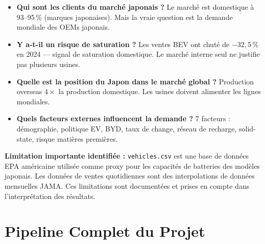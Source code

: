 \documentclass[12pt,a4paper]{article}
\begin{document}
\begin{itemize}
  \item \textbf{Qui sont les clients du marché japonais ?} Le marché est domestique à 93--95\,\%
        (marques japonaises). Mais la vraie question est la demande mondiale des OEMs japonais.

  \item \textbf{Y a-t-il un risque de saturation ?} Les ventes BEV ont chuté de $-32{,}5\,\%$
        en 2024 --- signal de saturation domestique. Le marché interne seul ne justifie pas
        plusieurs usines.

  \item \textbf{Quelle est la position du Japon dans le marché global ?} Production overseas
        $4\times$ la production domestique. Les usines doivent alimenter les lignes mondiales.

  \item \textbf{Quels facteurs externes influencent la demande ?} 7 facteurs : démographie,
        politique EV, BYD, taux de change, réseau de recharge, solid-state, risque matières
        premières.
\end{itemize}

\begin{notebox}
\textbf{Limitation importante identifiée :} \texttt{vehicles.csv} est une base de données
EPA américaine utilisée comme proxy pour les capacités de batteries des modèles japonais.
Les données de ventes quotidiennes sont des interpolations de données mensuelles JAMA.
Ces limitations sont documentées et prises en compte dans l'interprétation des résultats.
\end{notebox}

\section{Pipeline Complet du Projet}
\end{document}
